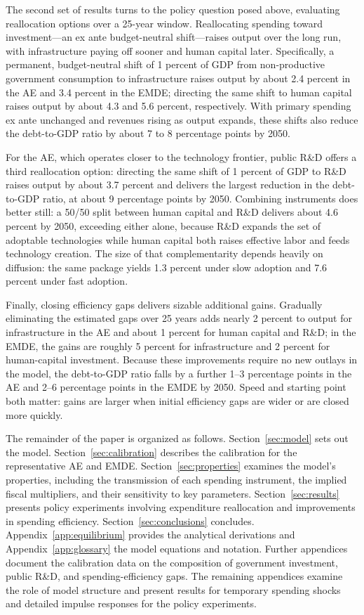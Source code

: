 \documentclass[a4paper,11pt]{article}
\begin{document}
The second set of results turns to the policy question posed above, evaluating reallocation options over a 25-year window.
Reallocating spending toward investment---an ex ante budget-neutral shift---raises output over the long run, with infrastructure paying off sooner and human capital later.
Specifically, a permanent, budget-neutral shift of 1 percent of GDP from non-productive government consumption to infrastructure raises output by about 2.4 percent in the AE and 3.4 percent in the EMDE; directing the same shift to human capital raises output by about 4.3 and 5.6 percent, respectively.
With primary spending ex ante unchanged and revenues rising as output expands, these shifts also reduce the debt-to-GDP ratio by about 7 to 8 percentage points by 2050.

For the AE, which operates closer to the technology frontier, public R\&D offers a third reallocation option: directing the same shift of 1 percent of GDP to R\&D raises output by about 3.7 percent and delivers the largest reduction in the debt-to-GDP ratio, at about 9 percentage points by 2050.
Combining instruments does better still: a 50/50 split between human capital and R\&D delivers about 4.6 percent by 2050, exceeding either alone, because R\&D expands the set of adoptable technologies while human capital both raises effective labor and feeds technology creation.
The size of that complementarity depends heavily on diffusion: the same package yields 1.3 percent under slow adoption and 7.6 percent under fast adoption.

Finally, closing efficiency gaps delivers sizable additional gains.
Gradually eliminating the estimated gaps over 25 years adds nearly 2 percent to output for infrastructure in the AE and about 1 percent for human capital and R\&D; in the EMDE, the gains are roughly 5 percent for infrastructure and 2 percent for human-capital investment.
Because these improvements require no new outlays in the model, the debt-to-GDP ratio falls by a further 1--3 percentage points in the AE and 2--6 percentage points in the EMDE by 2050.
Speed and starting point both matter: gains are larger when initial efficiency gaps are wider or are closed more quickly.


The remainder of the paper is organized as follows.
Section~\ref{sec:model} sets out the model.
Section~\ref{sec:calibration} describes the calibration for the representative AE and EMDE.
Section~\ref{sec:properties} examines the model's properties, including the transmission of each spending instrument, the implied fiscal multipliers, and their sensitivity to key parameters.
Section~\ref{sec:results} presents policy experiments involving expenditure reallocation and improvements in spending efficiency.
Section~\ref{sec:conclusions} concludes.
Appendix~\ref{app:equilibrium} provides the analytical derivations and Appendix~\ref{app:glossary} the model equations and notation.
Further appendices document the calibration data on the composition of government investment, public R\&D, and spending-efficiency gaps.
The remaining appendices examine the role of model structure and present results for temporary spending shocks and detailed impulse responses for the policy experiments.
\end{document}
